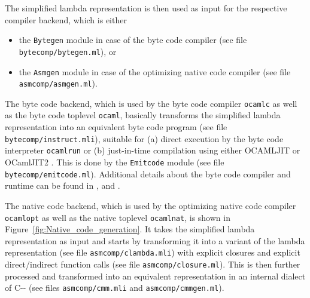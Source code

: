 \documentclass[10pt,a4paper,draft,twocolumn]{article}
\begin{document}
The simplified lambda representation is then used as input for the respective compiler
backend, which is either
\begin{itemize}
\item the \texttt{Bytegen} module in case of the byte code compiler
  (see file \texttt{bytecomp/bytegen.ml}), or
\item the \texttt{Asmgen} module in case of the optimizing native code compiler
  (see file \texttt{asmcomp/asmgen.ml}).
\end{itemize}

The byte code backend, which is used by the byte code compiler \texttt{ocamlc} as well as
the byte code toplevel \texttt{ocaml}, basically transforms the simplified lambda representation
into an equivalent byte code program (see file \texttt{bytecomp/instruct.mli}), suitable for
(a) direct execution by the byte code interpreter \texttt{ocamlrun} or (b) just-in-time
compilation using either OCAMLJIT \cite{Starynkevitch04} or OCamlJIT2
\cite{Meurer10jit,Meurer10ocamljit,Meurer11ocamljit2}.
This is done by the \texttt{Emitcode} module (see file \texttt{bytecomp/emitcode.ml}).
Additional details about the byte code compiler and runtime can be found in \cite{Leroy90},
\cite{Meurer10ocamljit} and \cite{Starynkevitch04}.

The native code backend, which is used by the optimizing native code compiler \texttt{ocamlopt}
as well as the native toplevel \texttt{ocamlnat}, is shown in Figure~\ref{fig:Native_code_generation}.
It takes the simplified lambda representation as input and starts by transforming it into a variant
of the lambda representation (see file \texttt{asmcomp/clambda.mli}) with explicit closures and
explicit direct/indirect function calls (see file \texttt{asmcomp/closure.ml}). This is then further
processed and transformed into an equivalent representation in an internal dialect of C\mbox{-}\mbox{-}
\cite{JonesR98,JonesRR99} (see files \texttt{asmcomp/cmm.mli} and \texttt{asmcomp/cmmgen.ml}).
\end{document}

